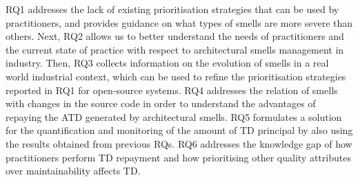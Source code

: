 RQ1 addresses the lack of existing prioritisation strategies that can be used by practitioners, and provides guidance on what types of smells are more severe than others.
Next, RQ2 allows us to better understand the needs of practitioners and the current state of practice with respect to architectural smells management in industry.
Then, RQ3 collects information on the evolution of smells in a real world industrial context, which can be used to refine the prioritisation strategies reported in RQ1 for open-source systems.
RQ4 addresses the relation of smells with changes in the source code in order to understand the advantages of repaying the ATD generated by architectural smells.
RQ5 formulates a solution for the quantification and monitoring of the amount of TD principal by also using the results obtained from previous RQs.
RQ6 addresses the knowledge gap of how practitioners perform TD repayment and how prioritising other quality attributes over maintainability affects TD.


